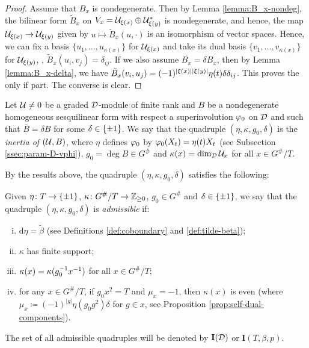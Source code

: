 \begin{proof}
	Assume that $B_x$ is nondegenerate.
	Then by Lemma \ref{lemma:B_x-nondeg}, the bilinear form $\tilde B_x$ on $V_x = \mathcal U_{\xi(x)} \oplus \mathcal U_{\xi(y)}^*$ is nondegenerate, and hence, the map $\mathcal U_{\xi(x)} \to \mathcal U_{\xi(y)}$ given by $u \mapsto \tilde B_x (u, \cdot)$  is an isomorphism of vector spaces.
	Hence, we can fix a basis $\{u_1, \ldots, u_{\kappa(x)} \}$ for $\mathcal U_{\xi(x)}$ and take its dual basis $\{v_1, \ldots, v_{\kappa(x)} \}$ for $\mathcal U_{\xi(y)}$, \ie, $\tilde B_x (u_i, v_j) = \delta_{ij}$.
	If we also assume $\overline{B_x} = \delta B_x$, then by Lemma \ref{lemma:B_x-delta}, we have $\tilde B_x (v_i, u_j) = (-1)^{|\xi(x)||\xi(y)|} \eta(t) \delta \delta_{ij}$.
	This proves the only if part.
	The converse is clear.
\end{proof}

\begin{defi}\label{def:parameter-of-(U,B)}
	Let $\mathcal U\neq 0$ be a graded $\mathcal{D}$-module of finite rank and $B$ be a nondegenerate homogeneous sesquilinear form with respect a superinvolution $\varphi_0$ on $\mathcal{D}$ and such that $\overline{B} = \delta B$ for some $\delta \in \{ \pm 1 \}$.
	We say that the quadruple $(\eta, \kappa, g_0, \delta)$ is the \emph{inertia of $(\mathcal U, B)$}, where $\eta$ defines $\varphi_0$ by $\varphi_0(X_t) = \eta(t)X_t$ (see Subsection \ref{ssec:param-D-vphi}), $g_0 = \deg B \in G^\#$ and $\kappa(x) = \dim_{\mathcal{D}} \mathcal U_x$ for all $x \in G^\#/T$.
\end{defi}

By the results above, the quadruple $(\eta, \kappa, g_0, \delta)$ satisfies the following:

\begin{defi}\label{defi:X(D)}
	Given $\eta\colon T \to \{ \pm 1 \}$,
	$\kappa\colon G^\#/T \to \mathbb{Z}_{\geq 0}$, $g_0 \in G^\#$ and $\delta \in \{ \pm 1 \}$, we say that the quadruple $(\eta, \kappa, g_0, \delta)$ is \emph{admissible} if:
	\begin{enumerate}[(i)]
		\item $\mathrm{d}\eta = \tilde\beta$ (see Definitions \ref{def:coboundary} and \ref{def:tilde-beta}); \label{item:eta-is-eta}
		\item $\kappa$ has finite support; \label{item:kappa-finite-support}
		\item $\kappa(x) = \kappa(g_0^{-1} x^{-1})$ for all $x \in G^\#/T$; \label{item:kappa-duality}
		\item for any $x\in G^\#/T$, if $g_0 x^2 = T$ and $\mu_x = -1$, then $\kappa (x)$ is even (where \\$\mu_x\coloneqq (-1)^{|g|}\eta(g_0g^2)\delta$ for $g\in x$, see Proposition \ref{prop:self-dual-components}). \label{item:kappa-parity}
	\end{enumerate}
	The set of all admissible quadruples will be denoted by $\mathbf{I}(\mathcal{D})$ or $\mathbf{I}(T, \beta, p)$.
\end{defi}


